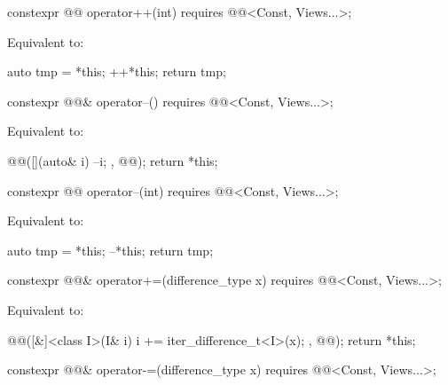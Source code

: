 \begin{itemdecl}
constexpr @@ operator++(int) requires @@<Const, Views...>;
\end{itemdecl}

\begin{itemdescr}
\pnum
\effects
Equivalent to:
\begin{codeblock}
auto tmp = *this;
++*this;
return tmp;
\end{codeblock}
\end{itemdescr}

\begin{itemdecl}
constexpr @@& operator--() requires @@<Const, Views...>;
\end{itemdecl}

\begin{itemdescr}
\pnum
\effects
Equivalent to:
\begin{codeblock}
@@([](auto& i) { --i; }, @@);
return *this;
\end{codeblock}
\end{itemdescr}

\begin{itemdecl}
constexpr @@ operator--(int) requires @@<Const, Views...>;
\end{itemdecl}

\begin{itemdescr}
\pnum
\effects
Equivalent to:
\begin{codeblock}
auto tmp = *this;
--*this;
return tmp;
\end{codeblock}
\end{itemdescr}

\begin{itemdecl}
constexpr @@& operator+=(difference_type x)
  requires @@<Const, Views...>;
\end{itemdecl}

\begin{itemdescr}
\pnum
\effects
Equivalent to:
\begin{codeblock}
@@([&]<class I>(I& i) { i += iter_difference_t<I>(x); }, @@);
return *this;
\end{codeblock}
\end{itemdescr}

\begin{itemdecl}
constexpr @@& operator-=(difference_type x)
  requires @@<Const, Views...>;
\end{itemdecl}

